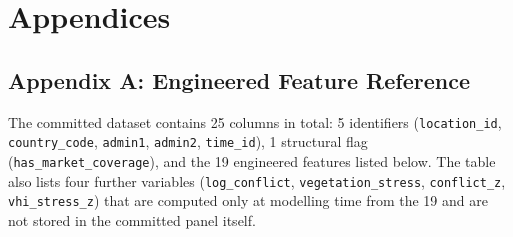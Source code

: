 \documentclass[12pt,a4paper]{article}
\begin{document}
\appendix
\clearpage
\section*{Appendices}

\subsection*{Appendix A: Engineered Feature Reference}

The committed dataset contains 25 columns in total: 5 identifiers (\texttt{location\_id}, \texttt{country\_code}, \texttt{admin1}, \texttt{admin2}, \texttt{time\_id}), 1 structural flag (\texttt{has\_market\_coverage}), and the 19 engineered features listed below. The table also lists four further variables (\texttt{log\_conflict}, \texttt{vegetation\_stress}, \texttt{conflict\_z}, \texttt{vhi\_stress\_z}) that are computed only at modelling time from the 19 and are not stored in the committed panel itself.
\end{document}
